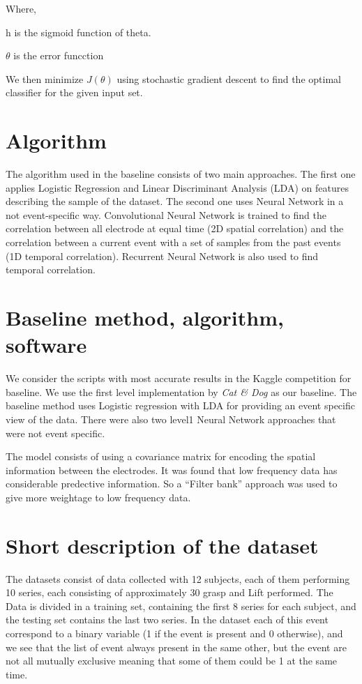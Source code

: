 \documentclass[final,leqno,onefignum,onetabnum]{siamltexmm}
\begin{document}
  Where,

  h is the sigmoid function of theta.

  \(\theta\) is the error funcction

  We then minimize \(J(\theta)\) using stochastic gradient descent to find the optimal classifier for the given input set.

\section{Algorithm}
The algorithm used in the baseline consists of two main approaches. The first one applies Logistic Regression and Linear Discriminant Analysis (LDA) on features describing the sample of the dataset. The second one uses Neural Network in a not event-specific way. Convolutional Neural Network is trained to find the correlation between all electrode at equal time (2D spatial correlation) and the correlation between a current event with a set of samples from the past events (1D temporal correlation). Recurrent Neural Network is also used to find temporal correlation.


\section{Baseline method, algorithm, software}
We consider the scripts with most accurate results in the Kaggle competition for baseline\cite{kaggleleaderboard}.  We use the first level implementation by \textit{Cat \& Dog}\cite{kagglewinners} as our baseline.
The baseline method uses Logistic regression with LDA for providing an event specific view of the data.  There were also two level1 Neural Network approaches that were not event specific.

The model consists of using a covariance matrix for encoding the spatial information between the electrodes.  It was found that low frequency data has considerable predective information.  So a ``Filter bank'' approach was used to give more weightage to low frequency data.

\section{Short description of the dataset}
The  datasets consist of data collected with 12 subjects, each of them performing 10 series, each consisting of approximately 30 grasp and Lift performed. The Data is divided in a  training set, containing the first 8 series for each subject, and  the testing set contains the last two series.
In the dataset each of this event correspond to a binary variable (1 if the event is present and 0 otherwise), and we see that the list of event always present in the same other, but the event are not all mutually exclusive meaning that some of  them could be 1 at the same time.  
\end{document}
